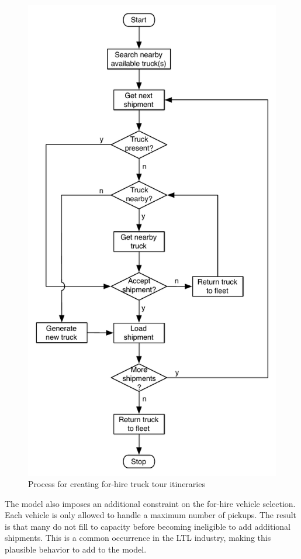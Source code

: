 \begin{figure}[!b]
\centering
\includegraphics[scale=0.7]{ct/ForHireTrucks}
\caption{Process for creating for-hire truck tour itineraries}
\label{fig:ct-forhire-tour-formation}
\end{figure}

The model also imposes an additional constraint on the for-hire vehicle selection. Each vehicle is only allowed to handle a maximum number of pickups. The result is that many do not fill to capacity before becoming ineligible to add additional shipments. This is a common occurrence in the LTL industry, making this plausible behavior to add to the model.

